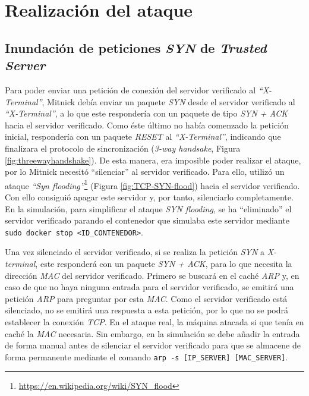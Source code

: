 \documentclass{article}
\begin{document}
\section{Realización del ataque} 

\subsection{Inundación de peticiones \textit{SYN} de \textit{Trusted Server}}

Para poder enviar una petición de conexión del servidor verificado al \textit{``X-Terminal''}, Mitnick debía enviar un paquete \textit{SYN} desde el servidor verificado al \textit{``X-Terminal''}, a lo que este respondería con un paquete de tipo \textit{SYN + ACK} hacia el servidor verificado. Como éste último no había comenzado la petición inicial, respondería con un paquete \textit{RESET} al \textit{``X-Terminal''}, indicando que finalizara el protocolo de sincronización (\textit{3-way handsake}, Figura \ref{fig:threewayhandshake}). De esta manera, era imposible poder realizar el ataque, por lo Mitnick necesitó ``silenciar'' al servidor verificado. Para ello, utilizó un ataque \textit{``Syn flooding''}\footnote{\url{https://en.wikipedia.org/wiki/SYN_flood}} (Figura \ref{fig:TCP-SYN-flood}) hacia el servidor verificado. Con ello consiguió apagar este servidor y, por tanto, silenciarlo completamente.\\

En la simulación, para simplificar el ataque \textit{SYN flooding}, se ha ``eliminado'' el servidor verificado parando el contenedor que simulaba este servidor mediante \texttt{sudo docker stop <ID\_CONTENEDOR>}.

Una vez silenciado el servidor verificado, si se realiza la petición \textit{SYN} a \textit{X-terminal}, este responderá con un paquete \textit{SYN + ACK}, para lo que necesita la dirección \textit{MAC} del servidor verificado. Primero se buscará en el caché \textit{ARP} y, en caso de que no haya ninguna entrada para el servidor verificado, se emitirá una petición \textit{ARP} para preguntar por esta \textit{MAC}. Como el servidor verificado está silenciado, no se emitirá una respuesta a esta petición, por lo que no se podrá establecer la conexión \textit{TCP}. En el ataque real, la máquina atacada si que tenía en caché la \textit{MAC} necesaria. Sin embargo, en la simulación se debe añadir la entrada de forma manual antes de silenciar el servidor verificado para que se almacene de forma permanente mediante el comando \texttt{arp -s [IP\_SERVER] [MAC\_SERVER]}.
\end{document}
